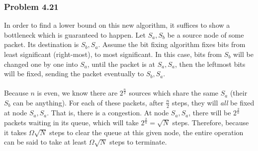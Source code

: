 \documentclass[12pt,letterpaper]{article}
\newenvironment{answer}[1]{
  \subsubsection*{Problem #1}
}{\newpage}
\begin{document}
\begin{answer}{4.21}
In order to find a lower bound on this new algorithm, it suffices to show a bottleneck which is guaranteed to happen. Let $S_a,S_b$ be a source node of some packet. Its destination is $S_b,S_a$. Assume the bit fixing algorithm fixes bits from least significant (right-most), to most significant. In this case, bits from $S_b$ will be changed one by one into $S_a$, until the packet is at $S_a,S_a$, then the leftmost bits will be fixed, sending the packet eventually to $S_b,S_a$. \\\\

Because $n$ is even, we know there are $2^{\frac{n}{2}}$ sources which share the same $S_a$ (their $S_b$ can be anything). For each of these packets, after $\frac{n}{2}$ steps, they will \emph{all} be fixed at node $S_a, S_a$. That is, there is a congestion. At node $S_a, S_a$, there will be $2^{\frac{2}{n}}$ packets waiting in its queue, which will take $2^{\frac{2}{n}} = \sqrt{N}$ steps. Therefore, because it takes $\Omega{\sqrt{N}}$ steps to clear the queue at this given node, the entire operation can be said to take at least $\Omega{\sqrt{N}}$ steps to terminate.
\end{answer}
\end{document}
